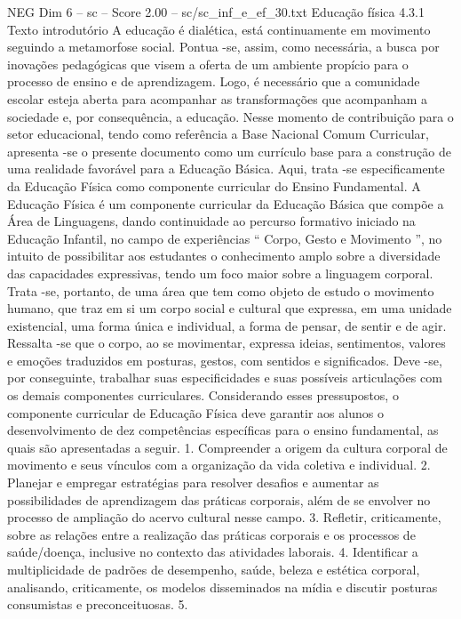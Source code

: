 \begin{textsample}{NEG Dim 6 – sc – Score 2.00 – sc/sc\_inf\_e\_ef\_30.txt}  \label{ex:f6_neg_278}
Educação física 4.3.1 Texto introdutório A educação é dialética, está continuamente em movimento seguindo a metamorfose social.
Pontua -se, assim, como necessária, a busca por inovações pedagógicas que visem a oferta de um ambiente propício para o processo de ensino e de aprendizagem.
Logo, é necessário que a comunidade escolar esteja aberta para acompanhar as transformações que acompanham a sociedade e, por consequência, a educação.
Nesse momento de contribuição para o setor educacional, tendo como referência a Base Nacional Comum Curricular, apresenta -se o presente documento como um currículo base para a construção de uma realidade favorável para a Educação Básica.
Aqui, trata -se especificamente da Educação Física como componente curricular do Ensino Fundamental.
A Educação Física é um componente curricular da Educação Básica que compõe a Área de Linguagens, dando continuidade ao percurso formativo iniciado na Educação Infantil, no campo de experiências “ Corpo, Gesto e Movimento ”, no intuito de possibilitar aos estudantes o conhecimento amplo sobre a diversidade das capacidades expressivas, tendo um foco maior sobre a linguagem corporal.
Trata -se, portanto, de uma área que tem como objeto de estudo o movimento humano, que traz em si um corpo social e cultural que expressa, em uma unidade existencial, uma forma única e individual, a forma de pensar, de sentir e de agir.
Ressalta -se que o corpo, ao se movimentar, expressa ideias, sentimentos, valores e emoções traduzidos em posturas, gestos, com sentidos e significados.
Deve -se, por conseguinte, trabalhar suas especificidades e suas possíveis articulações com os demais componentes curriculares.
Considerando esses pressupostos, o componente curricular de Educação Física deve garantir aos alunos o desenvolvimento de dez competências específicas para o ensino fundamental, as quais são apresentadas a seguir. 1.
Compreender a origem da cultura corporal de movimento e seus vínculos com a organização da vida coletiva e individual. 2.
Planejar e empregar estratégias para resolver desafios e aumentar as possibilidades de aprendizagem das práticas corporais, além de se envolver no processo de ampliação do acervo cultural nesse campo. 3.
Refletir, criticamente, sobre as relações entre a realização das práticas corporais e os processos de saúde/doença, inclusive no contexto das atividades laborais. 4.
Identificar a multiplicidade de padrões de desempenho, saúde, beleza e estética corporal, analisando, criticamente, os modelos disseminados na mídia e discutir posturas consumistas e preconceituosas. 5.

\end{textsample}
